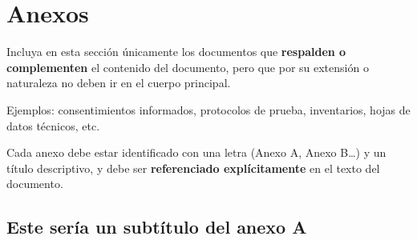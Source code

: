 \documentclass[11pt]{article}
\begin{document}
\begingroup
\renewcommand*{\bibfont}{\fontsize{8}{10}\selectfont}
\printbibliography
\endgroup
{}


\newpage
\section{Anexos}
Incluya en esta sección únicamente los documentos que \textbf{respalden o complementen} el contenido del documento, pero que por su extensión o naturaleza no deben ir en el cuerpo principal. 

\par \vspace{12pt}

Ejemplos: consentimientos informados, protocolos de prueba, inventarios, hojas de datos técnicos, etc.
\par \vspace{12pt}

Cada anexo debe estar identificado con una letra (Anexo A, Anexo B…) y un título descriptivo, y debe ser \textbf{referenciado explícitamente} en el texto del documento.

\subsection{Este sería un subtítulo del anexo A}
\end{document}
